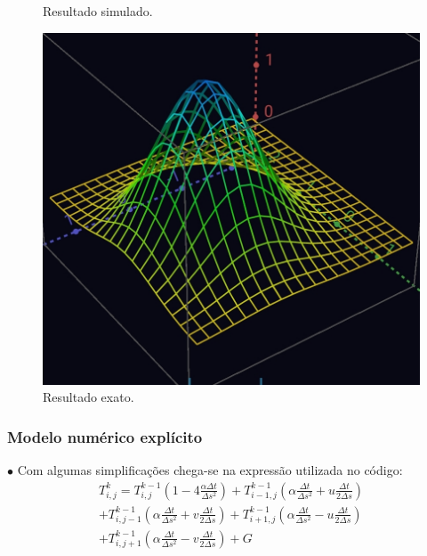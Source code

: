 \documentclass[xcolor=dvipsnames,10pt,aspectratio=169]{beamer}
\begin{document}
\begin{frame}
\begin{minipage}[h!]{0.17\textwidth}
\begin{figure}[h!]
				\caption{Resultado simulado.}
			\end{figure}
			\begin{figure}[h!]
				\centering
				\includegraphics[trim = {0cm 0cm 0cm 0cm}, clip , angle=0, scale=0.07]{images/resultado_analitico}
				\caption{ Resultado exato.}
			\end{figure}
		\end{minipage}
	\end{frame}





	\begin{frame}
		\frametitle{Modelo numérico explícito}
		$\bullet$ Com algumas simplificações chega-se na expressão utilizada no código:
		\begin{equation}
			\begin{split}
			T_{i,j}^{k} = T_{i,j}^{k-1} \left( 1 - 4 \frac{\alpha \Delta t}{\Delta s ^2}\right) + T_{i -1, j}^{k-1} \left( \alpha \frac{\Delta t}{\Delta s^2} + u \frac{\Delta t}{2 \Delta s} \right)\\
			+ T_{i,j-1}^{k-1} \left( \alpha \frac{\Delta t}{\Delta s^2} + v \frac{\Delta t}{2 \Delta s} \right) +  T_{i+1,j}^{k-1} \left( \alpha \frac{\Delta t}{ \Delta s^2} - u \frac{\Delta t}{2 \Delta s}\right) \\
			+  T_{i,j+1}^{k-1} \left( \alpha \frac{\Delta t}{\Delta s^2} - v \frac{\Delta t}{2 \Delta s}\right) + G
			\end{split}
		\end{equation}
	\end{frame}
\end{document}
